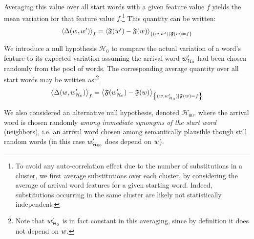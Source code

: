 Averaging this value over all start words with a given feature value $f$ yields the mean variation for that feature value $f$.\footnote{To avoid any auto-correlation effect due to the number of substitutions in a cluster, we first average substitutions over each cluster, by considering the average of arrival word features for a given starting word. Indeed, substitutions occurring in the same cluster are likely not statistically independent.} This 
quantity can be written:
$$\left< \Delta(w,w') \right>_f = \left< \mathfrak{F}(w') - \mathfrak{F}(w) \right>_{\left\lbrace (w,w') | \mathfrak{F}(w) = f \right\rbrace}$$

We introduce a null hypothesis $\mathcal{H}_0$ to compare the actual variation of a word's feature to its expected variation assuming the arrival word $w'_{\mathcal{H}_0}$ had been chosen randomly from %
the pool of  words. The corresponding average quantity over all start words may be written as:\footnote{Note that $w'_{\mathcal{H}_0}$ is in fact constant in this averaging, since by definition it does not depend on $w$.}
$$\left< \Delta(w,w'_{\mathcal{H}_0}) \right>_f
= \left< \mathfrak{F}({w'_{\mathcal{H}_0}}) - \mathfrak{F}(w) \right>_{\left\lbrace (w,w'_{\mathcal{H}_0}) | \mathfrak{F}(w) = f \right\rbrace}$$

We also considered an alternative null hypothesis, denoted $\mathcal{H}_{00}$, where the arrival word is chosen randomly \emph{among immediate synonyms of the start word} (neighbors), i.e. an arrival word chosen among semantically plausible though still random words (in this case $w'_{\mathcal{H}_{00}}$ does depend on $w$). %

